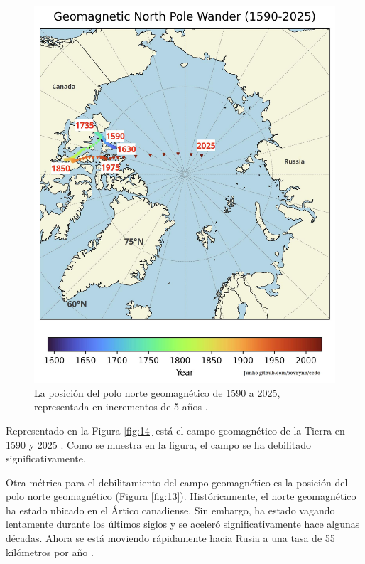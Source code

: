 \documentclass[10pt,twocolumn,letterpaper]{article}
\begin{document}
\begin{figure}[t]
\begin{center}
   \includegraphics[width=1\linewidth]{npw.jpg}
\end{center}
   \caption{La posición del polo norte geomagnético de 1590 a 2025, representada en incrementos de 5 años \cite{142}.}
\label{fig:13}
\label{fig:onecol}
\end{figure}


Representado en la Figura \ref{fig:14} está el campo geomagnético de la Tierra en 1590 y 2025 \cite{125,126}. Como se muestra en la figura, el campo se ha debilitado significativamente.

Otra métrica para el debilitamiento del campo geomagnético es la posición del polo norte geomagnético (Figura \ref{fig:13}). Históricamente, el norte geomagnético ha estado ubicado en el Ártico canadiense. Sin embargo, ha estado vagando lentamente durante los últimos siglos y se aceleró significativamente hace algunas décadas. Ahora se está moviendo rápidamente hacia Rusia a una tasa de 55 kilómetros por año \cite{124}.
\end{document}
